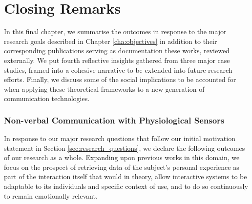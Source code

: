 



\chapter{Closing Remarks}
\label{cha:conclusion}

In this final chapter, we summarise the outcomes in response to the major research goals described in Chapter \ref{cha:objectives} in addition to their corresponding publications serving as documentation these works, reviewed externally. We put fourth reflective insights gathered from three major case studies, framed into a cohesive narrative to be extended into future research efforts. Finally, we discuss some of the social implications to be accounted for when applying these theoretical frameworks to a new generation of communication technologies.

\subsection{Non-verbal Communication with Physiological Sensors}

In response to our major research questions that follow our initial motivation statement in Section \ref{sec:research_questions}, we declare the following outcomes of our research as a whole. Expanding upon previous works in this domain, we focus on the prospect of retrieving data of the subject's personal experience as part of the interaction itself that would in theory, allow interactive systems to be adaptable to its individuals and specific context of use, and to do so continuously to remain emotionally relevant.

